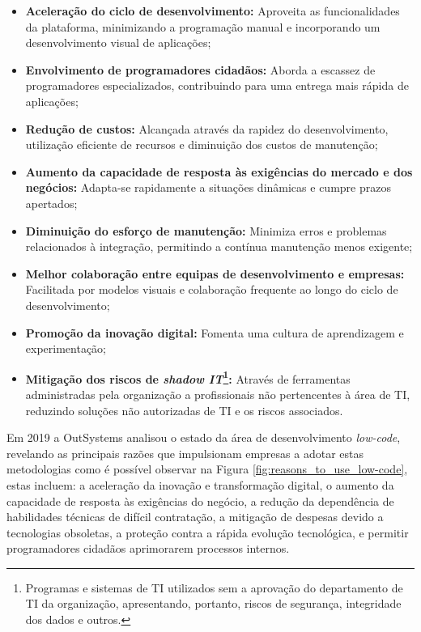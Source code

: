             \begin{itemize}
                \item \textbf{Aceleração do ciclo de desenvolvimento:} Aproveita as funcionalidades da plataforma, minimizando a programação manual e incorporando um desenvolvimento visual de aplicações;
                \item \textbf{Envolvimento de programadores cidadãos:} Aborda a escassez de programadores especializados, contribuindo para uma entrega mais rápida de aplicações;
                \item \textbf{Redução de custos:} Alcançada através da rapidez do desenvolvimento, utilização eficiente de recursos e diminuição dos custos de manutenção;
                \item \textbf{Aumento da capacidade de resposta às exigências do mercado e dos negócios:} Adapta-se rapidamente a situações dinâmicas e cumpre prazos apertados;
                \item \textbf{Diminuição do esforço de manutenção:} Minimiza erros e problemas relacionados à integração, permitindo a contínua manutenção menos exigente;
                \item \textbf{Melhor colaboração entre equipas de desenvolvimento e empresas:} Facilitada por modelos visuais e colaboração frequente ao longo do ciclo de desenvolvimento;
                \item \textbf{Promoção da inovação digital:} Fomenta uma cultura de aprendizagem e experimentação;
                \item \textbf{Mitigação dos riscos de \textit{shadow IT}\footnote{Programas e sistemas de TI utilizados sem a aprovação do departamento de TI da organização, apresentando, portanto, riscos de segurança, integridade dos dados e outros.}:} Através de ferramentas administradas pela organização a profissionais não pertencentes à área 
                de TI, reduzindo soluções não autorizadas de TI e os riscos associados\cite{rokis2023exploring}.
            \end{itemize}

            Em 2019 a OutSystems analisou o estado da área de desenvolvimento \textit{low-code}, revelando as principais razões que impulsionam empresas a adotar estas metodologias como é possível observar na Figura \ref{fig:reasons_to_use_low-code}, estas incluem: a aceleração da inovação e transformação digital, o aumento da capacidade de resposta às exigências do negócio, a redução da dependência de habilidades técnicas de difícil contratação, a mitigação de despesas devido a tecnologias obsoletas, a proteção contra a rápida evolução tecnológica, e permitir programadores cidadãos aprimorarem processos internos.
    
